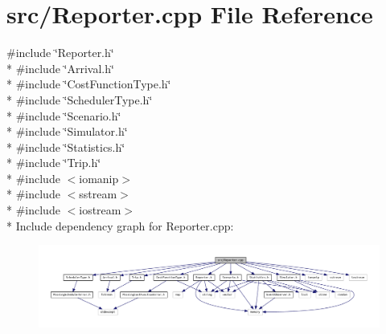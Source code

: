 \section{src/\+Reporter.cpp File Reference}
\label{_reporter_8cpp}
{\ttfamily \#include \char`\"{}Reporter.\+h\char`\"{}}\\*
{\ttfamily \#include \char`\"{}Arrival.\+h\char`\"{}}\\*
{\ttfamily \#include \char`\"{}Cost\+Function\+Type.\+h\char`\"{}}\\*
{\ttfamily \#include \char`\"{}Scheduler\+Type.\+h\char`\"{}}\\*
{\ttfamily \#include \char`\"{}Scenario.\+h\char`\"{}}\\*
{\ttfamily \#include \char`\"{}Simulator.\+h\char`\"{}}\\*
{\ttfamily \#include \char`\"{}Statistics.\+h\char`\"{}}\\*
{\ttfamily \#include \char`\"{}Trip.\+h\char`\"{}}\\*
{\ttfamily \#include $<$iomanip$>$}\\*
{\ttfamily \#include $<$sstream$>$}\\*
{\ttfamily \#include $<$iostream$>$}\\*
Include dependency graph for Reporter.\+cpp\+:
\nopagebreak
\begin{figure}[H]
\begin{center}
\leavevmode
\includegraphics[width=350pt]{_reporter_8cpp__incl}
\end{center}
\end{figure}
